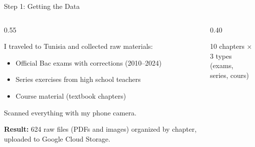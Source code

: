 \documentclass[aspectratio=169, 11pt]{beamer}
\begin{document}
\begin{frame}{Step 1: Getting the Data}

\begin{columns}[T]
\begin{column}{0.55\textwidth}

I traveled to Tunisia and collected raw materials:
\begin{itemize}
    \item Official Bac exams with corrections (2010--2024)
    \item Series exercises from high school teachers
    \item Course material (textbook chapters)
\end{itemize}

\bigskip

Scanned everything with my phone camera.

\bigskip

\textbf{Result:} 624 raw files (PDFs and images) organized by chapter, uploaded to Google Cloud Storage.

\end{column}
\begin{column}{0.40\textwidth}
\begin{center}

\vspace{0.3cm}
\small 10 chapters $\times$ 3 types\\
(exams, series, cours)
\end{center}
\end{column}
\end{columns}

\end{frame}
\end{document}
